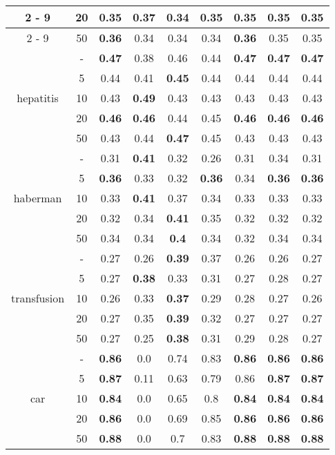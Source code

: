 \documentclass{article}%
\begin{document}
\begin{tabular}{c|c|ccccccc}
\cline{2%
-%
9}%
&20&0.35&\textbf{0.37}&0.34&0.35&0.35&0.35&0.35\\%
\cline{2%
-%
9}%
&50&\textbf{0.36}&0.34&0.34&0.34&\textbf{0.36}&0.35&0.35\\%
\hline%
\multirow{5}{*}{hepatitis}&{-}&\textbf{0.47}&0.38&0.46&0.44&\textbf{0.47}&\textbf{0.47}&\textbf{0.47}\\%
\cline{2%
-%
9}%
&5&0.44&0.41&\textbf{0.45}&0.44&0.44&0.44&0.44\\%
\cline{2%
-%
9}%
&10&0.43&\textbf{0.49}&0.43&0.43&0.43&0.43&0.43\\%
\cline{2%
-%
9}%
&20&\textbf{0.46}&\textbf{0.46}&0.44&0.45&\textbf{0.46}&\textbf{0.46}&\textbf{0.46}\\%
\cline{2%
-%
9}%
&50&0.43&0.44&\textbf{0.47}&0.45&0.43&0.43&0.43\\%
\hline%
\multirow{5}{*}{haberman}&{-}&0.31&\textbf{0.41}&0.32&0.26&0.31&0.34&0.31\\%
\cline{2%
-%
9}%
&5&\textbf{0.36}&0.33&0.32&\textbf{0.36}&0.34&\textbf{0.36}&\textbf{0.36}\\%
\cline{2%
-%
9}%
&10&0.33&\textbf{0.41}&0.37&0.34&0.33&0.33&0.33\\%
\cline{2%
-%
9}%
&20&0.32&0.34&\textbf{0.41}&0.35&0.32&0.32&0.32\\%
\cline{2%
-%
9}%
&50&0.34&0.34&\textbf{0.4}&0.34&0.32&0.34&0.34\\%
\hline%
\multirow{5}{*}{transfusion}&{-}&0.27&0.26&\textbf{0.39}&0.37&0.26&0.26&0.27\\%
\cline{2%
-%
9}%
&5&0.27&\textbf{0.38}&0.33&0.31&0.27&0.28&0.27\\%
\cline{2%
-%
9}%
&10&0.26&0.33&\textbf{0.37}&0.29&0.28&0.27&0.26\\%
\cline{2%
-%
9}%
&20&0.27&0.35&\textbf{0.39}&0.32&0.27&0.27&0.27\\%
\cline{2%
-%
9}%
&50&0.27&0.25&\textbf{0.38}&0.31&0.29&0.28&0.27\\%
\hline%
\multirow{5}{*}{car}&{-}&\textbf{0.86}&0.0&0.74&0.83&\textbf{0.86}&\textbf{0.86}&\textbf{0.86}\\%
\cline{2%
-%
9}%
&5&\textbf{0.87}&0.11&0.63&0.79&0.86&\textbf{0.87}&\textbf{0.87}\\%
\cline{2%
-%
9}%
&10&\textbf{0.84}&0.0&0.65&0.8&\textbf{0.84}&\textbf{0.84}&\textbf{0.84}\\%
\cline{2%
-%
9}%
&20&\textbf{0.86}&0.0&0.69&0.85&\textbf{0.86}&\textbf{0.86}&\textbf{0.86}\\%
\cline{2%
-%
9}%
&50&\textbf{0.88}&0.0&0.7&0.83&\textbf{0.88}&\textbf{0.88}&\textbf{0.88}\\%

\end{tabular}
\end{document}
